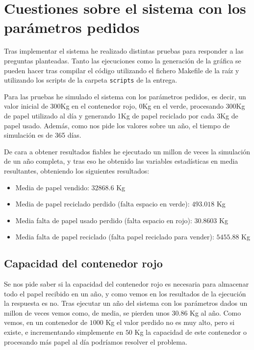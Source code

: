 \documentclass[12pt, spanish]{article}
\begin{document}
\section{Cuestiones sobre el sistema con los parámetros pedidos}

Tras implementar el sistema he realizado distintas pruebas para responder a las preguntas planteadas. Tanto las ejecuciones como la generación de la gráfica se pueden hacer tras compilar el código utilizando el fichero Makefile de la raíz y utilizando los scripts de la carpeta \texttt{scripts} de la entrega.

Para las pruebas he simulado el sistema con los parámetros pedidos, es decir, un valor inicial de 300Kg en el contenedor rojo, 0Kg en el verde, procesando 300Kg de papel utilizado al día y generando 1Kg de papel reciclado por cada 3Kg de papel usado. Además, como nos pide los valores sobre un año, el tiempo de simulación es de 365 días.

De cara a obtener resultados fiables he ejecutado un millon de veces la simulación de un año completa, y tras eso he obtenido las variables estadísticas en media resultantes, obteniendo los siguientes resultados:

\begin{itemize}
	\item Media de papel vendido: $32868.6$ Kg
	\item Media de papel reciclado perdido (falta espacio en verde): $493.018$ Kg
	\item Media falta de papel usado perdido (falta espacio en rojo): $30.8603$ Kg
	\item Media falta de papel reciclado (falta papel reciclado para vender): $5455.88$ Kg
\end{itemize}

\subsection{Capacidad del contenedor rojo}

Se nos pide saber si la capacidad del contenedor rojo es necesaria para almacenar todo el papel recibido en un año, y como vemos en los resultados de la ejecución la respuesta es no. Tras ejecutar un año del sistema con los parámetros dados un millon de veces vemos como, de media, se pierden unos $30.86$ Kg al año. Como vemos, en un contenedor de $1000$ Kg el valor perdido no es muy alto, pero si existe, e incrementando simplemente en $50$ Kg la capacidad de este contenedor o procesando más papel al día podríamos resolver el problema.
\end{document}
